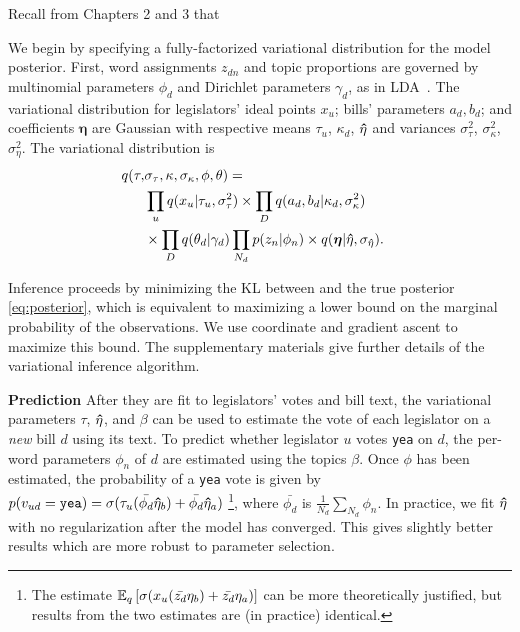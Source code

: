 Recall from Chapters 2 and 3 that 


We begin by specifying a fully-factorized variational distribution for
the model posterior.  First, word assignments $z_{dn}$ and topic
proportions are governed by multinomial parameters $\phi_d$ and
Dirichlet parameters $\gamma_d$, as in LDA~\cite{blei:2003}.  The
variational distribution for legislators' ideal points $x_u$;
bills' parameters $a_d, b_d$; and coefficients $\bm \eta$ are Gaussian
with respective means $\tau_u$, $\kappa_d$, $\bm \hat \eta$ and variances
$\sigma_\tau^2$, $\sigma_\kappa^2$, $\sigma_\eta^2$. The variational
distribution is
\begin{align}
\label{eq:var_post}
q(\tau, & \sigma_\tau, \kappa, \sigma_\kappa, \phi, \theta) = \\
& \prod_u q(x_u | \tau_u, \sigma_\tau^2 ) \times \prod_D q(a_d, b_d |
\kappa_d, \sigma_\kappa^2 ) & \nonumber \\
\textstyle & \times \prod_D q(\theta_d | \gamma_d) \prod_{N_d} p(z_n |
\phi_n) \times q(\bm \eta | \bm \hat \eta, \sigma_{\bm \hat \eta}). \nonumber
\end{align}

Inference proceeds by minimizing the KL between  and
the true posterior \ref{eq:posterior}, which is equivalent to
maximizing a lower bound on the marginal probability of the
observations.  We use coordinate and gradient ascent to maximize this
bound.  The supplementary materials give further details of the
variational inference algorithm.

\textbf{Prediction} After they are fit to legislators' votes and bill
text, the variational parameters $\tau$, $\bm \hat \eta$, and $\beta$ can be
used to estimate the vote of each legislator on a \emph{new} bill $d$
using its text.  To predict whether legislator $u$ votes \verb!yea! on
$d$, the per-word parameters $\phi_n$ of $d$ are estimated using the
topics $\beta$. Once $\phi$ has been estimated, the probability of a
\verb!yea! vote is given by $p(v_{ud} = \verb!yea!)  = \sigma(\tau_u
(\bar{\phi_d} \ev_b) + \bar{\phi_d} \ev_a)$
\footnote{The estimate $\mathbb{E}_q\left[\sigma(x_u (\bar{z_d} \eta_b) +
    \bar{z_d} \eta_a)\right]$ can be more theoretically justified, but
  results from the two estimates are (in practice) identical.}, where
$\bar{\phi_d}$ is $\frac{1}{N_d} \sum_{N_d} \phi_n$.  In practice, we
fit $\bm \hat \eta$ with no regularization after the model has converged.  This
gives slightly better results which are more robust to parameter
selection.


